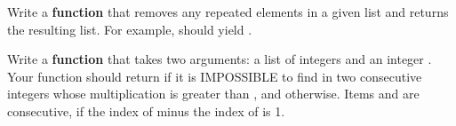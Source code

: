\documentclass[11pt]{exam}
\begin{document}

\vspace{10pt}
\begin{center}
\end{center}
\vspace{10pt}

\begin{questions}

\question[50] Write a {\bf function} that removes any repeated elements in a given list and returns the resulting list. For example, \pyv{[1,2,1,3,2,1]} should yield \pyv{[1,2,3]}.


\newpage

\question[50] Write a {\bf function} that takes two arguments: a list of integers  and an integer . Your function should return  if it is IMPOSSIBLE to find in  two consecutive integers whose multiplication is greater than , and  otherwise. Items  and  are consecutive, if the index of  minus the index of  is 1.

 
\end{questions}
\end{document}
